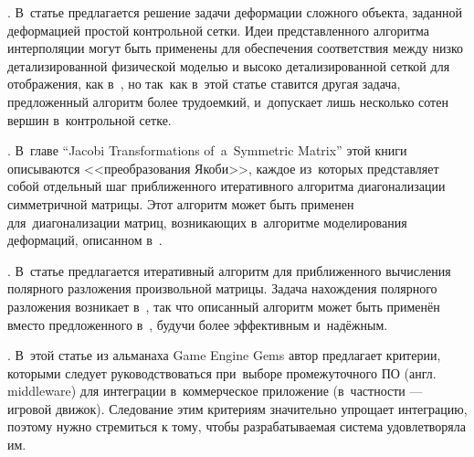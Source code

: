 \documentclass[a4paper,11pt]{report}
\begin{document}
    \cite[Efficient Mesh Deformation Using Tetrahedron Control Mesh]{huang-control-mesh}.
      В~статье предлагается решение задачи деформации сложного объекта, заданной деформацией простой
      контрольной сетки. Идеи представленного алгоритма интерполяции могут быть применены для
      обеспечения соответствия между низко детализированной физической моделью и высоко детализированной
      сеткой для отображения, как в~\cite{visser-mapping}, но так~как в~этой статье ставится другая
      задача, предложенный алгоритм более трудоемкий, и~допускает лишь несколько сотен вершин
      в~контрольной сетке.

    \cite[Numerical Recipes...]{fortran-jacobi}. В~главе {\English ``Jacobi Transformations
      of~a~Symmetric Matrix''} этой книги описываются <<преобразования Якоби>>, каждое из~которых
      представляет собой отдельный шаг приближенного итеративного алгоритма диагонализации
      симметричной матрицы. Этот алгоритм может быть применен для~диагонализации матриц, возникающих
      в~алгоритме моделирования деформаций, описанном в~\cite{muller-meshless}.

    \cite[Frobenius Iteration for the Matrix Polar Decomposition]{hp-polar}. В~статье
      предлагается итеративный алгоритм для приближенного вычисления полярного разложения
      произвольной матрицы. Задача нахождения полярного разложения возникает в~\cite{muller-meshless},
      так что описанный алгоритм может быть применён вместо предложенного в~\cite{muller-meshless},
      будучи более эффективным и~надёжным.

    \cite[What to Look for When Evaluating Middleware for Integration]{gems-middleware}.
      В~этой статье из альманаха {\English Game Engine Gems} автор предлагает критерии, которыми
      следует руководствоваться при~выборе промежуточного ПО (англ. {\English middleware}) для интеграции
      в~коммерческое приложение (в~частности --- игровой движок). Следование этим критериям
      значительно упрощает интеграцию, поэтому нужно стремиться к тому, чтобы разрабатываемая
      система удовлетворяла им.
\end{document}
